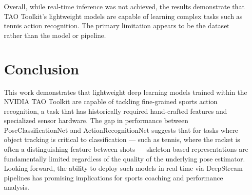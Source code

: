\documentclass[pdflatex,sn-mathphys-num]{sn-jnl}%
\theoremstyle{thmstyleone}%
\theoremstyle{thmstyletwo}%
\theoremstyle{thmstylethree}%
\begin{document}
Overall, while real-time inference was not achieved, the results demonstrate that TAO Toolkit’s lightweight models are capable of learning complex tasks such as tennis action recognition. The primary limitation appears to be the dataset rather than the model or pipeline.




\section{Conclusion}\label{sec6}

This work demonstrates that lightweight deep learning models trained within the NVIDIA TAO Toolkit are capable of tackling fine-grained sports action recognition, a task that has historically required hand-crafted features and specialized sensor hardware. The gap in performance between PoseClassificationNet and ActionRecognitionNet suggests that for tasks where object tracking is critical to classification --- such as tennis, where the racket is often a distinguishing feature between shots --- skeleton-based representations are fundamentally limited regardless of the quality of the underlying pose estimator. Looking forward, the ability to deploy such models in real-time via DeepStream pipelines has promising implications for sports coaching and performance analysis.





\end{document}
